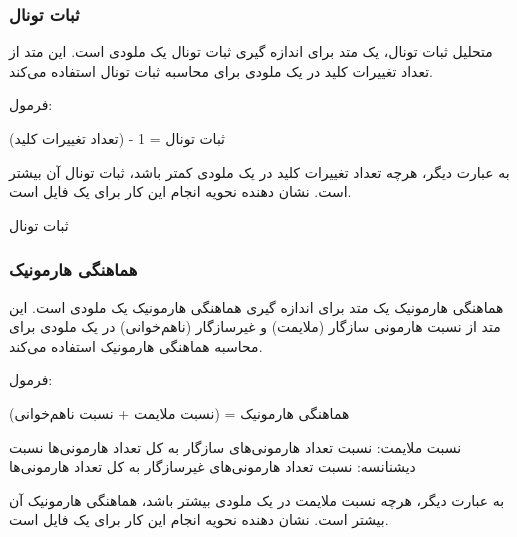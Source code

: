 \subsubsection{ ثبات تونال }

متحلیل ثبات تونال، یک متد برای اندازه گیری ثبات تونال یک ملودی است. این متد از تعداد تغییرات کلید در یک ملودی برای محاسبه ثبات تونال استفاده می‌کند.

فرمول:

ثبات تونال = 1 - (تعداد تغییرات کلید)

به عبارت دیگر، هرچه تعداد تغییرات کلید در یک ملودی کمتر باشد، ثبات تونال آن بیشتر است.
 نشان دهنده نحویه انجام این کار برای یک فایل  است.


\begin{LTR}
      \begin{algorithm}
            \caption{ثبات تونال }
            \setmainfont{Times New Roman}
            \label{alg:analyze_tonal_stability}
            \begin{algorithmic}
            \end{algorithmic}
      \end{algorithm}
\end{LTR}

\subsubsection{ هماهنگی هارمونیک  }

هماهنگی هارمونیک یک متد برای اندازه گیری هماهنگی هارمونیک یک ملودی است. این متد از نسبت هارمونی سازگار (ملایمت) و غیرسازگار (نا‌هم‌خوانی) در یک ملودی برای محاسبه هماهنگی هارمونیک استفاده می‌کند.

فرمول:

هماهنگی هارمونیک = (نسبت ملایمت + نسبت نا‌هم‌خوانی)

نسبت ملایمت: نسبت تعداد هارمونی‌های سازگار به کل تعداد هارمونی‌ها
نسبت دیشنانسه: نسبت تعداد هارمونی‌های غیرسازگار به کل تعداد هارمونی‌ها

به عبارت دیگر، هرچه نسبت ملایمت در یک ملودی بیشتر باشد، هماهنگی هارمونیک آن بیشتر است.
 نشان دهنده نحویه انجام این کار برای یک فایل  است.

